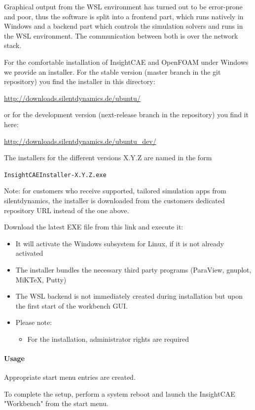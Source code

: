 Graphical output from the WSL environment has turned out to be error-prone and poor, thus the software is split into a frontend part, which runs natively in Windows and a backend part which controls the simulation solvers and runs in the WSL environment.
The communication between both is over the network stack.

For the comfortable installation of InsightCAE and OpenFOAM under Windows we provide an installer.
For the stable version (master branch in the git repository) you find the installer in this directory:

\url{http://downloads.silentdynamics.de/ubuntu/}

or for the development version (next-release branch in the repository) you find it here:

\url{http://downloads.silentdynamics.de/ubuntu_dev/}

The installers for the different versions X.Y.Z are named in the form 

\texttt{InsightCAEInstaller-X.Y.Z.exe}

Note: for customers who receive supported, tailored simulation apps from silentdynamics, the installer is downloaded from the customers dedicated repository URL instead of the one above.

Download the latest EXE file from this link and execute it:

\begin{itemize}
\item It will activate the Windows subsystem for Linux, if it is not already activated
\item The installer bundles the necessary third party programs (ParaView, gnuplot, MiKTeX, Putty)
\item The WSL backend is not immediately created during installation but upon the first start of the workbench GUI.
\item Please note:
\begin{itemize}
\item For the installation, administrator rights are required
\end{itemize}
\end{itemize}

\paragraph{Usage}

Appropriate start menu entries are created.

To complete the setup, perform a system reboot and launch the InsightCAE "Workbench" from the start menu.

